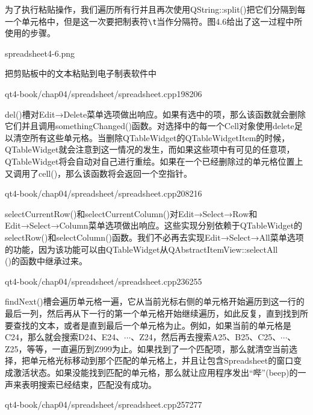 \documentclass[11pt,oneside]{book}
\begin{document}
\begin{common-format}
为了执行粘贴操作，我们遍历所有行并且再次使用QString::split()把它们分隔到每一个单元格中，但是这一次要把制表符\verb+\t+当作分隔符。图4.6给出了这一过程中所使用的步骤。
\begin{fig}[0.8]{spreadsheet4-6.png}
\caption{把剪贴板中的文本粘贴到电子制表软件中}
\label{fig:spreadsheet4-6.png}
\end{fig}

\begin{cppline}{qt4-book/chap04/spreadsheet/spreadsheet.cpp}{198}{206}
\end{cppline}

del()槽对Edit→Delete菜单选项做出响应。如果有选中的项，那么该函数就会删除它们并且调用somethingChanged()函数。对选择中的每一个Cell对象使用delete足以清空所有这些单元格。当删除QTableWidget的QTableWidgetItem的时候，QTableWidget就会注意到这一情况的发生，而如果这些项中有可见的任意项，QTableWidget将会自动对自己进行重绘。如果在一个已经删除过的单元格位置上又调用了cell()，那么该函数将会返回一个空指针。

\begin{cppline}{qt4-book/chap04/spreadsheet/spreadsheet.cpp}{208}{216}
\end{cppline}

selectCurrentRow()和selectCurrentColumn()对Edit→Select→Row和Edit→Select→Column菜单选项做出响应。这些实现分别依赖于QTableWidget的selectRow()和selectColumn()函数。我们不必再去实现Edit→Select→All菜单选项的功能，因为该功能可以由QTableWidget从QAbstractItemView::selectAll\\()的函数中继承过来。

\begin{cppline}{qt4-book/chap04/spreadsheet/spreadsheet.cpp}{236}{255}
\end{cppline}

findNext()槽会遍历单元格一遍，它从当前光标右侧的单元格开始遍历到这一行的最后一列，然后再从下一行的第一个单元格开始继续遍历，如此反复，直到找到所要查找的文本，或者是直到最后一个单元格为止。例如，如果当前的单元格是C24，那么就会搜索D24、E24、$ \cdots $、Z24，然后再去搜索A25、B25、C25、$ \cdots $、Z25，等等，一直遍历到Z999为止。如果找到了一个匹配项，那么就清空当前选择，把单元格光标移动到那个匹配的单元格上，并且让包含Spreadsheet的窗口变成激活状态。如果没能找到匹配的单元格，那么就让应用程序发出“哔”(beep)的一声来表明搜索已经结束，匹配没有成功。

\begin{cppline}{qt4-book/chap04/spreadsheet/spreadsheet.cpp}{257}{277}
\end{cppline}


\end{common-format}
\end{document}
